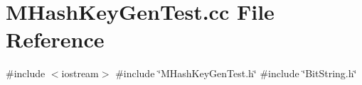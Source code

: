 \section{M\+Hash\+Key\+Gen\+Test.\+cc File Reference}
\label{MHashKeyGenTest_8cc}
{\ttfamily \#include $<$iostream$>$}\newline
{\ttfamily \#include \char`\"{}M\+Hash\+Key\+Gen\+Test.\+h\char`\"{}}\newline
{\ttfamily \#include \char`\"{}Bit\+String.\+h\char`\"{}}\newline
